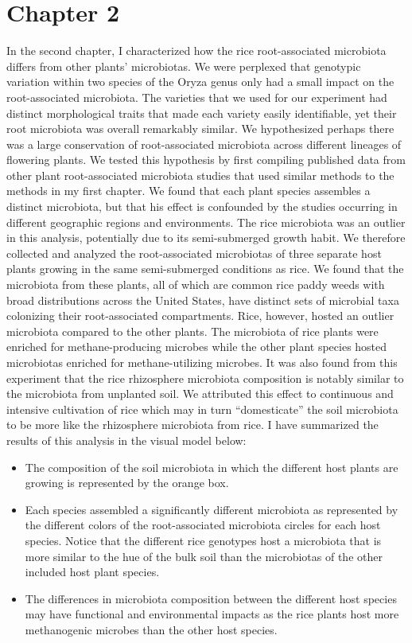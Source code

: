 \section{Chapter 2}
In the second chapter, I characterized how the rice root-associated microbiota differs from other plants' microbiotas. We were perplexed that genotypic variation within two species of the Oryza genus only had a small impact on the root-associated microbiota. The varieties that we used for our experiment had distinct morphological traits that made each variety easily identifiable, yet their root microbiota was overall remarkably similar. We hypothesized perhaps there was a large conservation of root-associated microbiota across different lineages of flowering plants. We tested this hypothesis by first compiling published data from other plant root-associated microbiota studies that used similar methods to the methods in my first chapter. We found that each plant species assembles a distinct microbiota, but that his effect is confounded by the studies occurring in different geographic regions and environments. The rice microbiota was an outlier in this analysis, potentially due to its semi-submerged growth habit. We therefore collected and analyzed the root-associated microbiotas of three separate host plants growing in the same semi-submerged conditions as rice. We found that the microbiota from these plants, all of which are common rice paddy weeds with broad distributions across the United States, have distinct sets of microbial taxa colonizing their root-associated compartments. Rice, however, hosted an outlier microbiota compared to the other plants. The microbiota of rice plants were enriched for methane-producing microbes while the other plant species hosted microbiotas enriched for methane-utilizing microbes. It was also found from this experiment that the rice rhizosphere microbiota composition is notably similar to the microbiota from unplanted soil. We attributed this effect to continuous and intensive cultivation of rice which may in turn ``domesticate'' the soil microbiota to be more like the rhizosphere microbiota from rice. I have summarized the results of this analysis in the visual model below:

\begin{itemize}
\item The composition of the soil microbiota in which the different host plants are growing is represented by the orange box.
\item Each species assembled a significantly different microbiota as represented by the different colors of the root-associated microbiota circles for each host species. Notice that the different rice genotypes host a microbiota that is more similar to the hue of the bulk soil than the microbiotas of the other included host plant species.
\item The differences in microbiota composition between the different host species may have functional and environmental impacts as the rice plants host more methanogenic microbes than the other host species.
\end{itemize}

